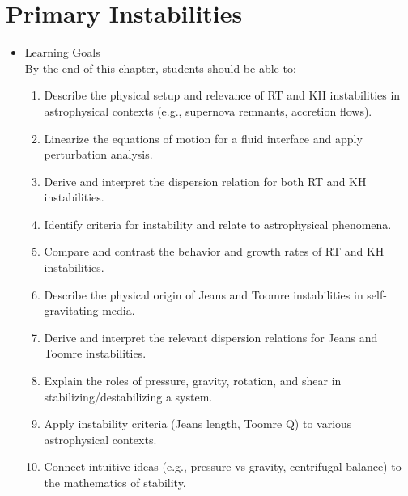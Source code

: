 \chapter{Primary Instabilities}

\begin{itemize}
\item Learning Goals\\
  By the end of this chapter, students should be able to:

  \begin{enumerate}

  \item Describe the physical setup and relevance of RT and KH
    instabilities in astrophysical contexts (e.g., supernova remnants,
    accretion flows).

  \item Linearize the equations of motion for a fluid interface and apply perturbation analysis.

  \item Derive and interpret the dispersion relation for both RT and KH instabilities.

  \item Identify criteria for instability and relate to astrophysical phenomena.

  \item Compare and contrast the behavior and growth rates of RT and KH
    instabilities.

  \item Describe the physical origin of Jeans and Toomre instabilities in self-gravitating media.

  \item Derive and interpret the relevant dispersion relations for
    Jeans and Toomre instabilities.

  \item Explain the roles of pressure, gravity, rotation, and shear in stabilizing/destabilizing a system.

  \item Apply instability criteria (Jeans length, Toomre Q) to various astrophysical contexts.

  \item Connect intuitive ideas (e.g., pressure vs gravity, centrifugal balance) to the mathematics of stability.
   

\end{enumerate}
\end{itemize}
